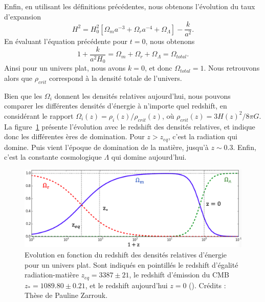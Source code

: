 \documentclass[11pt, twoside, a4paper, openright]{report}
\begin{document}
Enfin, en utilisant les définitions précédentes, nous obtenons l'évolution du taux d'expansion
\begin{equation}
  \label{eq:friedmann7}
  H^2 = H_0^2 \left[\Omega_m a^{-3} + \Omega_r a^{-4} + \Omega_{\Lambda} \right] - \frac{k}{a^{2}} .
\end{equation}
En évaluant l'équation précédente pour $t=0$, nous obtenons
\begin{equation}
  \label{eq:sum_omega}
 1 + \frac{k}{a^{2} H_{0}}  =  \Omega_m + \Omega_r + \Omega_{\Lambda} = \Omega_{total} .
\end{equation}
Ainsi pour un univers plat, nous avons $k = 0$, et donc $\Omega_{total} = 1$. Nous retrouvons alors que $\rho_{crit}$ correspond à la densité totale de l'univers. 

Bien que les $\Omega_i$ donnent les densités relatives aujourd'hui, nous pouvons comparer les différentes densités d'énergie à n'importe quel redshift, en considérant le rapport $\Omega_{i}(z) = \rho_{i}(z) / \rho_{crit}(z)$, où $\rho_{crit}(z) = 3H(z)^{2} / 8 \pi G$. La figure~\ref{fig:evol_omega} présente l'évolution  avec le redshift des densités relatives, et indique donc les différentes ères de domination. Pour $z > z_{eq}$, c'est la radiation qui domine. Puis vient l'époque de domination de la matière, jusqu'à $z \sim \num{0.3}$. Enfin, c'est la constante cosmologique $\Lambda$ qui domine aujourd'hui.
\begin{figure}
  \centering
  \includegraphics[scale=0.4]{evol_omega}
  \caption{Evolution en fonction du redshift des densités relatives d'énergie pour un univers plat. Sont indiqués en pointillés le redshift d'égalité radiation-matière $z_{eq} = 3387 \pm 21$, le redshift d'émission du CMB $z_{\ast} = \num{1089.80} \pm \num{0.21}$, et le redshift aujourd'hui $z = 0$ (\cite{Collaboration2018}). Crédits : Thèse de Pauline Zarrouk.}
\label{fig:evol_omega}
\end{figure}
\end{document}
